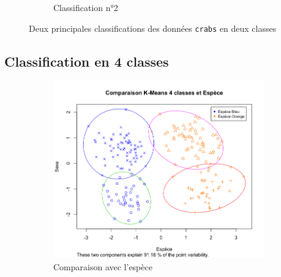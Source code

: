\documentclass[a4paper,10pt]{report}
\begin{document}
\begin{figure}[H]
\begin{subfigure}[b]{0.5\linewidth}
		\caption{\small Classification n°2}
		\label{fig:3-2-1-crabs-2-classes-classif-2-sex}
	\end{subfigure}%
	\caption{\small Deux principales classifications des données \texttt{crabs} en deux classes}
	\label{fig:3-2-1-Crabs-kmeans-2-classes}
\end{figure}





\subsection{Classification en 4 classes}



\begin{figure}[H]
	\centering
	\captionsetup{justification=centering, margin=2cm}
	\begin{subfigure}[b]{0.5\linewidth}
		\centering
		\captionsetup{justification=centering}
		\includegraphics[width=1\linewidth]{img/3-2-2-crabs-kmeans-4-classes-espece}
		\caption{\small Comparaison avec l'espèce}
		\label{fig:3-2-2-crabs-kmeans-4-classes-espece}
	\end{subfigure}%
	\begin{subfigure}[b]{0.5\linewidth}
		\centering
		\captionsetup{justification=centering}

\end{subfigure}
\end{figure}
\end{document}

